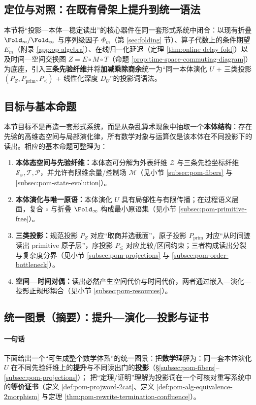 \subsection{定位与对照：在既有骨架上提升到统一语法}\label{subsec:pom-position}
本节将“投影—本体—稳定读出”的核心器件在同一套形式系统中闭合：以现有折叠 $\Fold_m/\Fold_\infty$ 与序列级因子 $\Phi_m$（第 \ref{sec:folding} 节）、算子代数上的条件期望 $E_m$（附录 \ref{app:op-algebra}）、在线归一化延迟（定理 \ref{thm:online-delay-fold}）以及时间—空间交换图 $Z=E\circ M\circ T$（命题 \ref{prop:time-space-commuting-diagram}）为底座，引入\textbf{三条先验纤维}并将\textbf{加减乘除商余}统一为“同一本体演化 $U$ + 三类投影 $(P_Z,P_{\mathrm{prim}},P_{\le})$ + 线性化深度 $D_U$”的投影词语法。

\subsection{目标与基本命题}\label{subsec:pom-goal}
本节目标不是再造一套形式系统，而是从杂乱算术现象中抽取一个\textbf{本体结构}：存在先验的高维态空间与局部演化律，所有数学对象与运算仅是该本体在不同投影下的读出。相应的基本命题可整理为：
\begin{enumerate}
  \item \textbf{本体态空间与先验纤维：}本体态可分解为外表纤维 $\mathcal Z$ 与三条先验坐标纤维 $\mathcal S_\varphi,\mathcal T,\mathcal P$，并允许有限维余量/控制场 $\mathcal M$（见小节 \ref{subsec:pom-fibers} 与 \ref{subsec:pom-state-evolution}）。
  \item \textbf{本体演化与唯一原语：}本体演化 $U$ 具有局部性与有限传播；在过程语义层面，复合 $\circ$ 与折叠 $\Fold_\infty$ 构成最小原语集（见小节 \ref{subsec:pom-primitive-free}）。
  \item \textbf{三类投影：}规范投影 $P_Z$ 对应“取商并选截面”，原子投影 $P_{\mathrm{prim}}$ 对应“从时间迹读出 primitive 原子层”，序投影 $P_{\le}$ 对应比较/区间约束；三者构成读出分裂与复杂度分界（见小节 \ref{subsec:pom-projections} 与 \ref{subsec:pom-order-bottleneck}）。
  \item \textbf{空间—时间对偶：}读出必然产生空间代价与时间代价，两者通过嵌入—演化—投影正规形耦合（见小节 \ref{subsec:pom-resources}）。
\end{enumerate}

\subsection{统一图景（摘要）：提升—演化—投影与证书}\label{subsec:pom-unified-picture}
\paragraph{一句话}
下面给出一个“可生成整个数学体系”的统一图景：把\textbf{数学}理解为：同一套本体演化 \(U\) 在不同先验纤维上的\textbf{提升}与不同读出门的\textbf{投影}（\S\ref{subsec:pom-fibers}--\ref{subsec:pom-projections}）；
把“定理/证明”理解为投影词在一个可核对重写系统中的\textbf{等价证书}（定义 \ref{def:pom-projword-2cat}、定义 \ref{def:pom-alg-equivalence-2morphism} 与定理 \ref{thm:pom-rewrite-termination-confluence}）。

